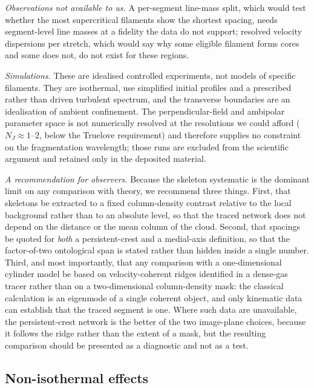 \documentclass[usenatbib,twoside,twocolumn]{mnras}
\begin{document}
\emph{Observations not available to us.} A per-segment line-mass split, which would test whether the most supercritical filaments show the shortest spacing, needs segment-level line masses at a fidelity the data do not support; resolved velocity dispersions per stretch, which would say why some eligible filament forms cores and some does not, do not exist for these regions.

\emph{Simulations.} These are idealised controlled experiments, not models of specific filaments. They are isothermal, use simplified initial profiles and a prescribed rather than driven turbulent spectrum, and the transverse boundaries are an idealisation of ambient confinement. The perpendicular-field and ambipolar parameter space is not numerically resolved at the resolutions we could afford ($N_J\approx1$--$2$, below the Truelove requirement) and therefore supplies no constraint on the fragmentation wavelength; those runs are excluded from the scientific argument and retained only in the deposited material.

\smallskip\noindent\emph{A recommendation for observers.} Because the skeleton systematic is the dominant limit on any comparison with theory, we recommend three things. First, that skeletons be extracted to a fixed column-density contrast relative to the local background rather than to an absolute level, so that the traced network does not depend on the distance or the mean column of the cloud. Second, that spacings be quoted for \emph{both} a persistent-crest and a medial-axis definition, so that the factor-of-two ontological span is stated rather than hidden inside a single number. Third, and most importantly, that any comparison with a one-dimensional cylinder model be based on velocity-coherent ridges identified in a dense-gas tracer rather than on a two-dimensional column-density mask: the classical calculation is an eigenmode of a single coherent object, and only kinematic data can establish that the traced segment is one. Where such data are unavailable, the persistent-crest network is the better of the two image-plane choices, because it follows the ridge rather than the extent of a mask, but the resulting comparison should be presented as a diagnostic and not as a test.



\subsection{Non-isothermal effects}
\label{sec:mt_variation}
\end{document}
